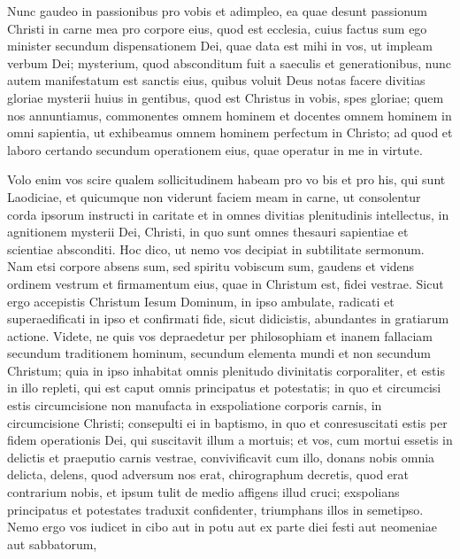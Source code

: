 \begin{biblechapter}
 \verse Nunc gaudeo in passionibus pro vobis et adimpleo, ea quae desunt passionum Christi in carne mea pro corpore eius, quod est ecclesia, 
\verse cuius factus sum ego minister secundum dispensationem Dei, quae data est mihi in vos, ut impleam verbum Dei; 
\verse mysterium, quod absconditum fuit a saeculis et generationibus, nunc autem manifestatum est sanctis eius, 
\verse quibus voluit Deus notas facere divitias gloriae mysterii huius in gentibus, quod est Christus in vobis, spes gloriae; 
\verse quem nos annuntiamus, commonentes omnem hominem et docentes omnem hominem in omni sapientia, ut exhibeamus omnem hominem perfectum in Christo; 
\verse ad quod et laboro certando secundum operationem eius, quae operatur in me in virtute.
 
\begin{biblechapter}
 \verse Volo enim vos scire qualem sollicitudinem habeam pro vo bis et pro his, qui sunt Laodiciae, et quicumque non viderunt faciem meam in carne, 
\verse ut consolentur corda ipsorum instructi in caritate et in omnes divitias plenitudinis intellectus, in agnitionem mysterii Dei, Christi, 
\verse in quo sunt omnes thesauri sapientiae et scientiae absconditi. 
\verse Hoc dico, ut nemo vos decipiat in subtilitate sermonum. 
\verse Nam etsi corpore absens sum, sed spiritu vobiscum sum, gaudens et videns ordinem vestrum et firmamentum eius, quae in Christum est, fidei vestrae.
 \verse Sicut ergo accepistis Christum Iesum Dominum, in ipso ambulate, 
\verse radicati et superaedificati in ipso et confirmati fide, sicut didicistis, abundantes in gratiarum actione. 
\verse Videte, ne quis vos depraedetur per philosophiam et inanem fallaciam secundum traditionem hominum, secundum elementa mundi et non secundum Christum; 
\verse quia in ipso inhabitat omnis plenitudo divinitatis corporaliter, 
\verse et estis in illo repleti, qui est caput omnis principatus et potestatis; 
\verse in quo et circumcisi estis circumcisione non manufacta in exspoliatione corporis carnis, in circumcisione Christi; 
\verse consepulti ei in baptismo, in quo et conresuscitati estis per fidem operationis Dei, qui suscitavit illum a mortuis; 
\verse et vos, cum mortui essetis in delictis et praeputio carnis vestrae, convivificavit cum illo, donans nobis omnia delicta, 
\verse delens, quod adversum nos erat, chirographum decretis, quod erat contrarium nobis, et ipsum tulit de medio affigens illud cruci; 
\verse exspolians principatus et potestates traduxit confidenter, triumphans illos in semetipso.
 \verse Nemo ergo vos iudicet in cibo aut in potu aut ex parte diei festi aut neomeniae aut sabbatorum, 

\end{biblechapter}
\end{biblechapter}
